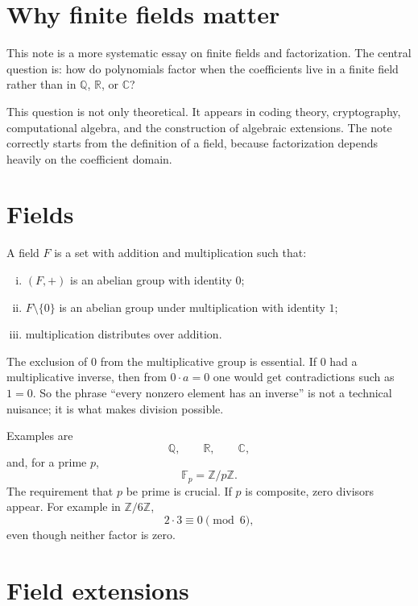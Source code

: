 
\section{Why finite fields matter}

This note is a more systematic essay on finite fields and factorization.  The central question is: how do polynomials factor when the coefficients live in a finite field rather than in \(\mathbb Q\), \(\mathbb R\), or \(\mathbb C\)?

This question is not only theoretical.  It appears in coding theory, cryptography, computational algebra, and the construction of algebraic extensions.  The note correctly starts from the definition of a field, because factorization depends heavily on the coefficient domain.

\section{Fields}

A field \(F\) is a set with addition and multiplication such that:
\begin{enumerate}[(i)]
  \item \((F,+)\) is an abelian group with identity \(0\);
  \item \(F\setminus\{0\}\) is an abelian group under multiplication with identity \(1\);
  \item multiplication distributes over addition.

\end{enumerate}
The exclusion of \(0\) from the multiplicative group is essential.  If \(0\) had a multiplicative inverse, then from \(0\cdot a=0\) one would get contradictions such as \(1=0\).  So the phrase ``every nonzero element has an inverse'' is not a technical nuisance; it is what makes division possible.

Examples are
\[
  \mathbb Q,\qquad \mathbb R,\qquad \mathbb C,
\]
and, for a prime \(p\),
\[
  \mathbb F_p=\mathbb Z/p\mathbb Z.
\]
The requirement that \(p\) be prime is crucial.  If \(p\) is composite, zero divisors appear.  For example in \(\mathbb Z/6\mathbb Z\),
\[
  2\cdot3\equiv0\pmod6,
\]
even though neither factor is zero.

\section{Field extensions}

